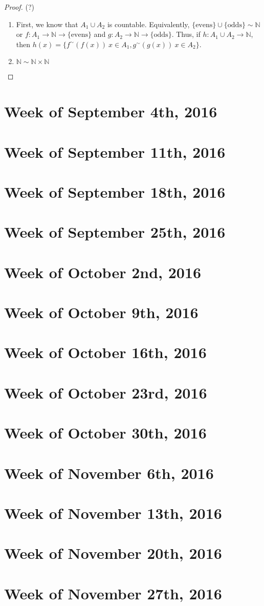 \documentclass{article}
\begin{document}
\begin{proof}(?)
\begin{enumerate}[label=\roman*)]
\item First, we know that $A_1\cup A_2$ is countable. Equivalently, $\{\text{evens}\}\cup\{\text{odds}\}\sim\mathbb{N}$ or $f:A_1\longrightarrow\mathbb{N}\longrightarrow \{\text{evens}\}$ and $g:A_2\longrightarrow\mathbb{N}\longrightarrow \{\text{odds}\}$. Thus, if $h:A_1\cup A_2\longrightarrow\mathbb{N}$, then $h(x)=\{f^{\sim}(f(x))\ x\in A_1, g^{\sim}(g(x))\ x\in A_2\}$.
\item $\mathbb{N}\sim\mathbb{N}\times\mathbb{N}$
\end{enumerate}
\end{proof}
\section{Week of September 4th, 2016}
\section{Week of September 11th, 2016}
\section{Week of September 18th, 2016}
\section{Week of September 25th, 2016}
\section{Week of October 2nd, 2016}
\section{Week of October 9th, 2016}
\section{Week of October 16th, 2016}
\section{Week of October 23rd, 2016}
\section{Week of October 30th, 2016}
\section{Week of November 6th, 2016}
\section{Week of November 13th, 2016}
\section{Week of November 20th, 2016}
\section{Week of November 27th, 2016}
\end{document}
